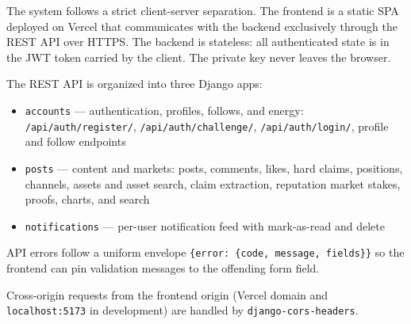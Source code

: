 \documentclass[a4paper,12pt]{report}
\begin{document}
The system follows a strict client-server separation. The frontend is a static SPA deployed on Vercel that communicates with the backend exclusively through the REST API over HTTPS. The backend is stateless: all authenticated state is in the JWT token carried by the client. The private key never leaves the browser.

The REST API is organized into three Django apps:
\begin{sloppypar}
\begin{itemize}
    \item \texttt{accounts} --- authentication, profiles, follows, and energy: \texttt{/api/auth/register/}, \texttt{/api/auth/challenge/}, \texttt{/api/auth/login/}, profile and follow endpoints
    \item \texttt{posts} --- content and markets: posts, comments, likes, hard claims, positions, channels, assets and asset search, claim extraction, reputation market stakes, proofs, charts, and search
    \item \texttt{notifications} --- per-user notification feed with mark-as-read and delete
\end{itemize}
\end{sloppypar}

API errors follow a uniform envelope \texttt{\{error: \{code, message, fields\}\}} so the frontend can pin validation messages to the offending form field.

\begin{sloppypar}
Cross-origin requests from the frontend origin (Vercel domain and \texttt{localhost:5173} in development) are handled by \texttt{django-cors-headers}.
\end{sloppypar}
\end{document}
